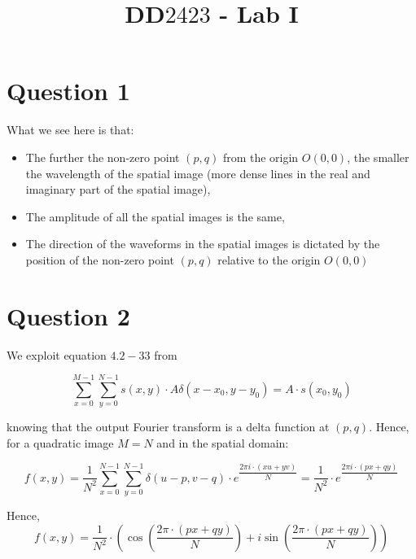 \documentclass[12pt]{article}
\title{DD$2423$ - Lab I}
\date{}
\begin{document}
	\maketitle
  
  	\section{Question 1}
  		What we see here is that:
  
  		\begin{itemize}
 
  		\item The further the non-zero point $(p,q)$ from the origin $O(0,0)$, the smaller the wavelength of the spatial image 
  		(more dense lines in the real and imaginary part of the spatial image),
  
  		\item The amplitude of all the spatial images is the same,
  
  		\item The direction of the waveforms in the spatial images is dictated by the position of the non-zero point $(p,q)$ relative to the origin $O(0,0)$
  
  		\end{itemize}


  	\section{Question 2}
  
  		We exploit equation $4.2-33$ from \cite{GZ}  
  
  		\begin{equation}
  			\sum_{x=0}^{M-1}\sum_{y=0}^{N-1} s(x,y) \cdot A \delta(x-x_0, y-y_0) = A \cdot s(x_0, y_0)
  		\end{equation}
  
  		knowing that the output Fourier transform is a delta function at $(p,q)$. Hence, for a quadratic image $M=N$ and in the spatial domain:
  
  		\begin{equation}
  			f(x,y)= \frac{1}{N^2} \sum_{x=0}^{N-1}\sum_{y=0}^{N-1} \delta(u - p, v - q) \cdot e^{\dfrac{2 \pi i \cdot (xu + yv)}{N}} = 
  			\frac{1}{N^2} \cdot e^{\dfrac{2 \pi i \cdot (px + qy)}{N}}
  		\end{equation}
  
	  	Hence, 
	  	\begin{equation}
	  		f(x,y) = \frac{1}{N^2} \cdot (\cos(\dfrac{2 \pi \cdot (px + qy)}{N}) + i\sin(\dfrac{2 \pi \cdot (px + qy)}{N}))
	  		\label{eq:q2:sin_form}
	  	\end{equation}
  
\end{document}
